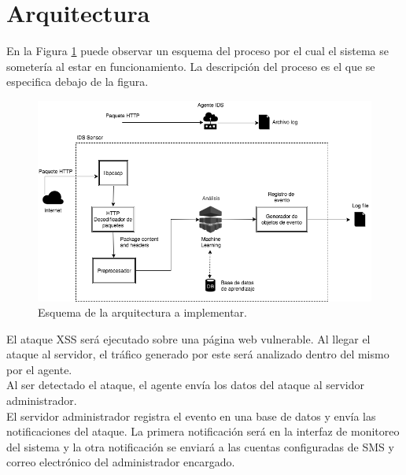 \section{Arquitectura}

En la Figura \ref{fig:ids_sensor} puede observar un esquema del proceso por el cual el sistema se sometería al estar en funcionamiento. La descripción del proceso es el que se especifica debajo de la figura.\\



\begin{figure}
	\centering
	\includegraphics[scale=.6]{images/IDS_Sensor}
	\caption{Esquema de la arquitectura a implementar.}
	\label{fig:ids_sensor}
\end{figure}

El ataque XSS será ejecutado sobre una página web vulnerable. Al llegar el ataque al servidor, el tráfico generado por este será analizado dentro del mismo por el agente.\\

Al ser detectado el ataque, el agente envía los datos del ataque al servidor administrador.\\

El servidor administrador registra el evento en una base de datos y envía las notificaciones del ataque. La primera notificación será en la interfaz de monitoreo del sistema y la otra notificación se enviará a las cuentas configuradas de SMS y correo electrónico del administrador encargado.\\

